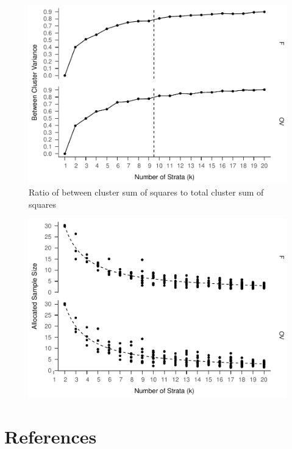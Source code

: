 \documentclass[floatsintext,man]{apa6}
\theoremstyle{definition}
\theoremstyle{definition}
\theoremstyle{definition}
\theoremstyle{remark}
\begin{document}
\begin{figure}
\centering
\includegraphics{Method_files/figure-latex/ratio-full-1.pdf}
\caption{\label{fig:ratio-full}Ratio of between cluster sum of squares to
total cluster sum of squares}
\end{figure}

\begin{figure}
\centering
\includegraphics{Method_files/figure-latex/k-size-full-1.pdf}
\caption{}
\end{figure}

\newpage

\section{References}\label{references}

\begingroup
\setlength{\parindent}{-0.5in} \setlength{\leftskip}{0.5in}

\hypertarget{refs}{}

\endgroup
\end{document}
